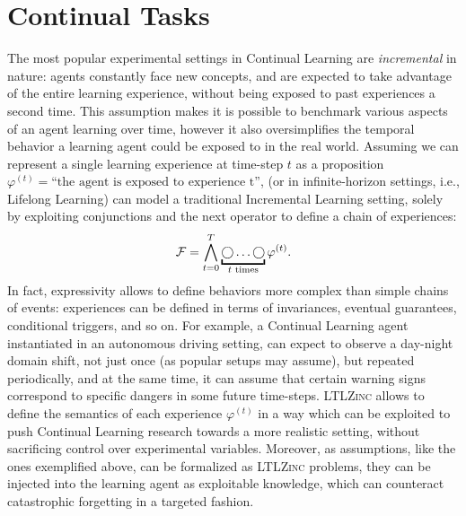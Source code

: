 \section{Continual Tasks}\label{ltlzinc:sec:inctasks}
The most popular experimental settings in Continual Learning are \textit{incremental} in nature: agents constantly face new concepts, and are expected to take advantage of the entire learning experience, without being exposed to past experiences a second time. This assumption makes it is possible to benchmark various aspects of an agent learning over time, however it also oversimplifies the temporal behavior a learning agent could be exposed to in the real world.
Assuming we can represent a single learning experience at time-step $t$ as a proposition $\varphi^{(t)} = \text{``the agent is exposed to experience t''}$, \LTLf (or \LTL in infinite-horizon settings, i.e., Lifelong Learning) can model a traditional Incremental Learning setting, solely by exploiting conjunctions and the next operator to define a chain of experiences: %
$$\gF = \bigwedge\limits_{t = 0}^{T} \underbracket{\ltlnext \dots \ltlnext}_{t\text{ times}}\varphi^{(t)}.$$
In fact, \LTLf expressivity allows to define behaviors more complex than simple chains of events: experiences can be defined in terms of invariances, eventual guarantees, conditional triggers, and so on. For example, a Continual Learning agent instantiated in an autonomous driving setting, can expect to observe a day-night domain shift, not just once (as popular setups may assume), but repeated periodically, and at the same time, it can assume that certain warning signs correspond to specific dangers in some future time-steps.
\textsc{LTLZinc} allows to define the semantics of each experience $\varphi^{(t)}$ in a way which can be exploited to push Continual Learning research towards a more realistic setting, without sacrificing control over experimental variables.
Moreover, as assumptions, like the ones exemplified above, can be formalized as \textsc{LTLZinc} problems, they can be injected into the learning agent as exploitable knowledge, which can counteract catastrophic forgetting in a targeted fashion.

